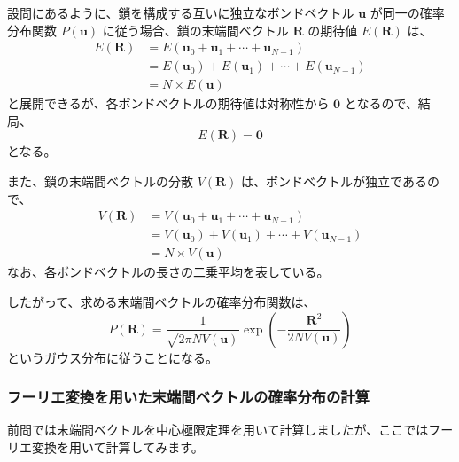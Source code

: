 \documentclass[uplatex,dvipdfmx,a4paper,11pt]{jsarticle}
\begin{document}
設問にあるように、鎖を構成する互いに独立なボンドベクトル $\bm{u}$ が同一の確率分布関数 $P(\bm{u})$ に従う場合、鎖の末端間ベクトル $\bm{R}$ の期待値 $E(\bm{R})$ は、
\begin{align*}
E(\bm{R}) 
	&= E(\bm{u}_0 + \bm{u}_1 + \cdots + \bm{u}_{N-1}) \\
	&= E(\bm{u}_0) + E(\bm{u}_1) + \cdots + E(\bm{u}_{N-1}) \\
	&= N \times E(\bm{u})
\end{align*}
と展開できるが、各ボンドベクトルの期待値は対称性から $\bm{0}$ となるので、結局、
\begin{equation*}
E(\bm{R}) = \bm{0}
\end{equation*}
となる。


また、鎖の末端間ベクトルの分散 $V(\bm{R})$ は、ボンドベクトルが独立であるので、
\begin{align*}
V(\bm{R}) 
	&= V(\bm{u}_0 + \bm{u}_1 + \cdots + \bm{u}_{N-1}) \\
	&= V(\bm{u}_0) + V(\bm{u}_1) + \cdots + V(\bm{u}_{N-1}) \\
	&= N \times V(\bm{u})
\end{align*}
なお、各ボンドベクトルの長さの二乗平均を表している。

したがって、求める末端間ベクトルの確率分布関数は、
\begin{equation*}
P(\bm{R}) = \dfrac{1}{\sqrt{2 \pi N V(\bm{u})}} \exp \left(-\dfrac{\bm{R}^2}{2 N V(\bm{u})} \right)
\end{equation*}
というガウス分布に従うことになる。



\newpage

\subsubsection{フーリエ変換を用いた末端間ベクトルの確率分布の計算}

\begin{boxnote}
前問では末端間ベクトルを中心極限定理を用いて計算しましたが、ここではフーリエ変換を用いて計算してみます。

\end{boxnote}

\vspace{10pt}
\end{document}
